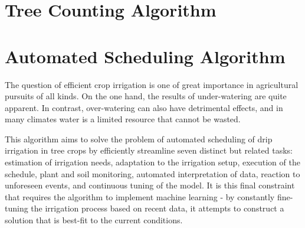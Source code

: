 \documentclass[]{article}
\begin{document}
\section{Tree Counting Algorithm}
\cite[Santoro 2013]{santoro2013tree}
\section{Automated Scheduling Algorithm}
The question of efficient crop irrigation is one of great importance in agricultural pursuits of all kinds. On the one hand, the results of under-watering are quite apparent. In contrast, over-watering can also have detrimental effects, and in many climates water is a limited resource that cannot be wasted.

This algorithm aims to solve the problem of automated scheduling of drip irrigation in tree crops by efficiently streamline seven distinct but related tasks: estimation of irrigation needs, adaptation to the irrigation setup, execution of the schedule, plant and soil monitoring, automated interpretation of data, reaction to unforeseen events, and continuous tuning of the model\cite[Casadesus 2012]{casadesus2012drip}. It is this final constraint that requires the algorithm to implement machine learning - by constantly fine-tuning the irrigation process based on recent data, it attempts to construct a solution that is best-fit to the current conditions.
\cite[Casadesus 2012]{casadesus2012drip}


\end{document}
